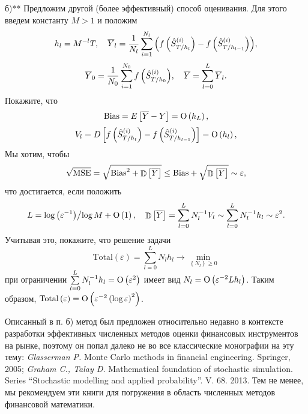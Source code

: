 \begin{problem} 
б)** Предложим другой (более эффективный) способ оценивания. Для 
этого введем константу $M>1$ и положим
\[
h_l =M^{-l}T,
\quad
\overline {Y}_l =\frac{1}{N_l }\sum\limits_{i=1}^{N_l } {\left( {f\left( {\hat 
{S}_{T \mathord{\left/ {\vphantom {T {h_l }}} \right. 
\kern-\nulldelimiterspace} {h_l }}^{\left( i \right)} } \right)-f\left( 
{\hat {S}_{T \mathord{\left/ {\vphantom {T {h_{l-1} }}} \right. 
\kern-\nulldelimiterspace} {h_{l-1} }}^{\left( i \right)} } \right)} 
\right)} ,
\]
\[
\overline {Y}_0 =\frac{1}{N_0 }\sum\limits_{i=1}^{N_0 } {f\left( {\hat {S}_{T 
\mathord{\left/ {\vphantom {T {h_0 }}} \right. \kern-\nulldelimiterspace} 
{h_0 }}^{\left( i \right)} } \right)} ,
\quad
\overline {Y}=\sum\limits_{l=0}^L {\overline {Y}_l } .
\]
Покажите, что
\[
\mbox{Bias}=E\left[ {\overline {Y}-Y} \right]={\rm O}\left( {h_L } \right),
\]
\[
V_l =D\left[ {f\left( {\hat {S}_{T \mathord{\left/ {\vphantom {T {h_l }}} 
\right. \kern-\nulldelimiterspace} {h_l }}^{\left( i \right)} } 
\right)-f\left( {\hat {S}_{T \mathord{\left/ {\vphantom {T {h_{l-1} }}} 
\right. \kern-\nulldelimiterspace} {h_{l-1} }}^{\left( i \right)} } \right)} 
\right]={\rm O}\left( {h_l } \right),
\]
Мы хотим, чтобы
\[
\sqrt {\mbox{MSE}} =\sqrt {\mbox{Bias}^2+\mathop{\mathbb{D}}\nolimits\left[ {\overline {Y}} \right]} \le 
\mbox{Bias}+\sqrt {\mathop{\mathbb{D}}\nolimits\left[ {\overline {Y}} \right]} \sim \varepsilon ,
\]
что достигается, если положить
\[
L={\log \left( {\varepsilon ^{-1}} \right)} \mathord{\left/ {\vphantom 
{{\log \left( {\varepsilon ^{-1}} \right)} {\log M}}} \right. 
\kern-\nulldelimiterspace} {\log M}+{\rm O}\left( 1 \right),
\quad
\Var\left[ {\overline {Y}} \right]=\sum\limits_{l=0}^L {N_l^{-1} V_l } \sim 
\sum\limits_{l=0}^L {N_l^{-1} h_l } \sim \varepsilon ^2.
\]
Учитывая это, покажите, что решение задачи $$\mbox{Total}\left( \varepsilon 
\right)=\sum\limits_{l=0}^L {N_l h_l } \to \mathop {\min }\limits_{\left\{ 
{N_l } \right\}\ge 0}$$ при ограничении $\sum\limits_{l=0}^L {N_l^{-1} h_l } 
={\rm O}\left( {\varepsilon ^2} \right)$ имеет вид $N_l ={\rm O}\left( 
{\varepsilon ^{-2}Lh_l } \right)$. Таким образом, $\mbox{Total}\left( 
\varepsilon \right)={\rm O}\left( {\varepsilon ^{-2}\left( {\log \varepsilon 
} \right)^2} \right)$.

\end{problem}

\begin{remark}
Описанный в п. б) метод был предложен относительно 
недавно в контексте разработки эффективных численных методов оценки 
финансовых инструментов на рынке, поэтому он попал далеко не во все 
классические монографии на эту тему: \textit{Glasserman P.} Monte Carlo methods in financial 
engineering. Springer, 2005; \textit{Graham C., Talay D. }Mathematical foundation of stochastic 
simulation. Series ``Stochastic modelling and applied probability''. V. 68. 
2013. Тем не менее, мы рекомендуем эти книги для погружения в область 
численных методов финансовой математики.

\end{remark}